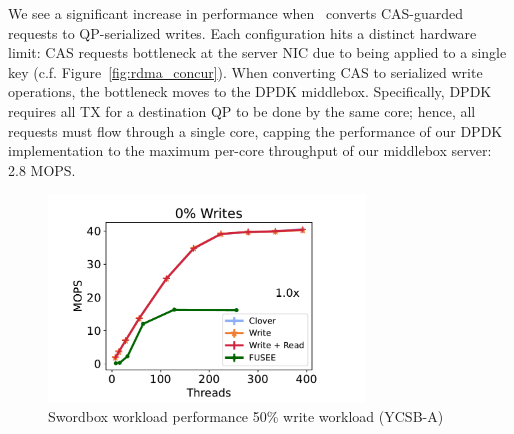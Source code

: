 %
%
We see a significant increase in performance when \sword\ converts
CAS-guarded requests to QP-serialized writes.  Each configuration hits
a distinct hardware limit: CAS requests bottleneck at the server NIC
due to being applied to a single key
(c.f. Figure~\ref{fig:rdma_concur}).  When converting CAS to
serialized write operations, the bottleneck moves to the DPDK
middlebox.
Specifically, DPDK requires all TX for a destination QP to be done by
the same core; hence,
all requests must flow through a single core, capping the  performance of our
DPDK implementation to the maximum per-core
throughput of our middlebox server: 2.8 MOPS.

\begin{figure}
    \center
    \includegraphics[width=0.75\textwidth]{fig/full_system_performance-a.pdf}
    \caption{Swordbox workload performance 50\% write workload (YCSB-A)}
    \label{fig:full_system_performance-a}
\end{figure}





